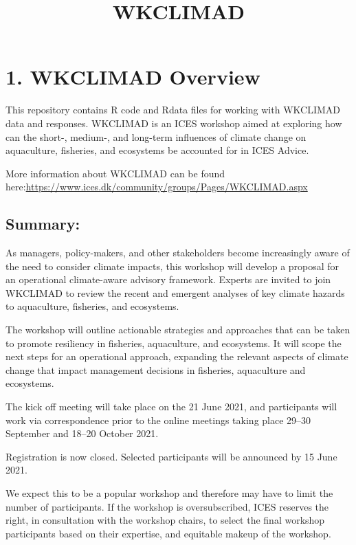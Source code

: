 \documentclass[
]{article}
\title{WKCLIMAD}
\author{}
\date{\vspace{-2.5em}}
\begin{document}
\maketitle

{
\setcounter{tocdepth}{2}
\tableofcontents
}
\hypertarget{wkclimad-overview}{%
\section{1. WKCLIMAD Overview}\label{wkclimad-overview}}

This repository contains R code and Rdata files for working with
WKCLIMAD data and responses. WKCLIMAD is an ICES workshop aimed at
exploring how can the short-, medium-, and long-term influences of
climate change on aquaculture, fisheries, and ecosystems be accounted
for in ICES Advice.

More information about WKCLIMAD can be found
here:\url{https://www.ices.dk/community/groups/Pages/WKCLIMAD.aspx}

\hypertarget{summary}{%
\subsection{Summary:}\label{summary}}

As managers, policy-makers, and other stakeholders become increasingly
aware of the need to consider climate impacts, this workshop will
develop a proposal for an operational climate-aware advisory framework.
Experts are invited to join WKCLIMAD to review the recent and emergent
analyses of key climate hazards to aquaculture, fisheries, and
ecosystems.

The workshop will outline actionable strategies and approaches that can
be taken to promote resiliency in fisheries, aquaculture, and
ecosystems. It will scope the next steps for an operational approach,
expanding the relevant aspects of climate change that impact management
decisions in fisheries, aquaculture and ecosystems.

The kick off meeting will take place on the 21 June 2021, and
participants will work via correspondence prior to the online meetings
taking place 29--30 September and 18--20 October 2021.

Registration is now closed. Selected participants will be announced by
15 June 2021.

We expect this to be a popular workshop and therefore may have to limit
the number of participants. If the workshop is oversubscribed, ICES
reserves the right, in consultation with the workshop chairs, to select
the final workshop participants based on their expertise, and equitable
makeup of the workshop.
\end{document}
